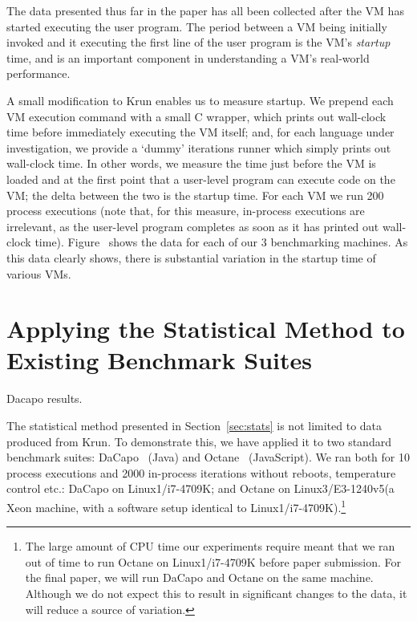 \documentclass[preprint,numbers,10pt]{sigplanconf}
\newcommand{\krun}{Krun\xspace}
\newcommand{\bencherthree}{Linux1/i7-4709K\xspace}
\newcommand{\bencherseven}{Linux3/E3-1240v5\xspace}
\begin{document}
The data presented thus far in the paper has all been collected after the VM has
started executing the user program. The period between a VM being initially
invoked and it executing the first line of the user program is the VM's \emph{startup} time,
and is an important component in understanding a VM's real-world performance.

A small modification to \krun enables us to measure startup. We prepend each VM
execution command with a small C wrapper, which prints out wall-clock time
before immediately executing the VM itself; and, for each language under
investigation, we provide a `dummy' iterations runner which simply prints out
wall-clock time. In other words, we measure the time just before the VM is loaded
and at the first point that a user-level program can execute code on the VM; the
delta between the two is the startup time. For each VM we run 200 process
executions (note that, for this measure, in-process executions are irrelevant,
as the user-level program completes as soon as it has printed out wall-clock
time). Figure~ shows the data for each of our
3 benchmarking machines. As this data clearly shows, there is substantial
variation in the startup time of various VMs.


\section{Applying the Statistical Method to Existing Benchmark Suites}
\label{sec:existing}

\begin{table}[t]
\centering

\caption{Dacapo results.}
\label{tab:dacapo}
\end{table}

The statistical method presented in Section~\ref{sec:stats} is not limited to data
produced from Krun. To demonstrate this, we have applied it to two standard
benchmark suites: DaCapo~\cite{dacapo06} (Java) and Octane~\cite{octane}
(JavaScript). We ran both for 10 process executions and 2000 in-process
iterations without reboots, temperature control etc.: DaCapo on \bencherthree;
and Octane on \bencherseven (a Xeon machine, with a software setup
identical to \bencherthree).\footnote{The large amount of CPU time our
experiments require meant that we ran out of time to run Octane on \bencherthree
before paper submission. For the final paper, we will run DaCapo and Octane on
the same machine. Although we do not expect this to result in significant
changes to the data, it will reduce a source of variation.}
\end{document}
